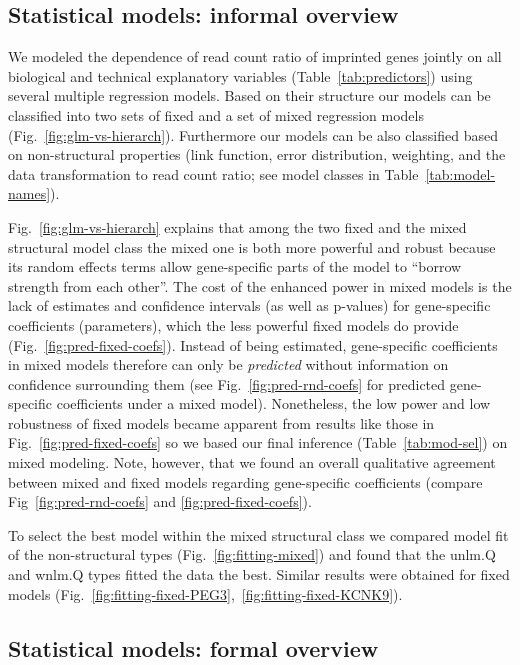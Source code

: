 \documentclass[letterpaper]{article}
\begin{document}
\subsection{Statistical models: informal overview}
\label{sec:regression-overview-informal}

We modeled the dependence of read count ratio of imprinted genes jointly on
all biological and technical explanatory variables
(Table~\ref{tab:predictors}) using several multiple regression models.  Based
on their structure our models can be classified into two sets of fixed and a
set of mixed regression models (Fig.~\ref{fig:glm-vs-hierarch}).  Furthermore
our models can be also classified based on non-structural properties (link
function, error distribution, weighting, and the data transformation to read
count ratio; see model classes in Table~\ref{tab:model-names}).

Fig.~\ref{fig:glm-vs-hierarch} explains that among the two fixed and the mixed
structural model class the mixed one is both more powerful and robust because
its random effects terms allow gene-specific parts of the model to ``borrow
strength from each other''.  The cost of the enhanced power in mixed models is
the lack of estimates and confidence intervals (as well as p-values) for
gene-specific coefficients (parameters), which the less powerful fixed models
do provide (Fig.~\ref{fig:pred-fixed-coefs}).  Instead of being estimated,
gene-specific coefficients in mixed models therefore can only be
\emph{predicted} without information on confidence surrounding them (see
Fig.~\ref{fig:pred-rnd-coefs} for predicted gene-specific coefficients under a
mixed model).  Nonetheless, the low power and low robustness of fixed models
became apparent from results like those in Fig.~\ref{fig:pred-fixed-coefs} so
we based our final inference (Table~\ref{tab:mod-sel}) on mixed modeling.
Note, however, that we found an overall qualitative agreement between mixed and
fixed models regarding gene-specific coefficients (compare
Fig~\ref{fig:pred-rnd-coefs} and \ref{fig:pred-fixed-coefs}).

To select the best model within the mixed structural class we compared model
fit of the non-structural types (Fig.~\ref{fig:fitting-mixed}) and found
that the unlm.Q and wnlm.Q types fitted the data the best.  Similar results
were obtained for fixed models
(Fig.~\ref{fig:fitting-fixed-PEG3},~\ref{fig:fitting-fixed-KCNK9}).

\subsection{Statistical models: formal overview}
\label{sec:regression-overview-formal}
\end{document}
